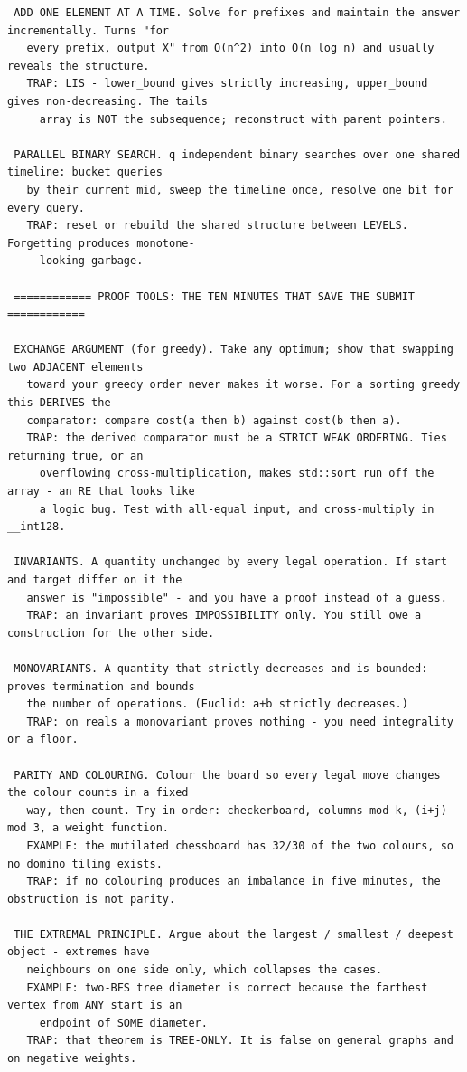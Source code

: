 \documentclass[9pt,a4paper,twocolumn]{extarticle}
\begin{document}
\begin{lstlisting}
 ADD ONE ELEMENT AT A TIME. Solve for prefixes and maintain the answer incrementally. Turns "for
   every prefix, output X" from O(n^2) into O(n log n) and usually reveals the structure.
   TRAP: LIS - lower_bound gives strictly increasing, upper_bound gives non-decreasing. The tails
     array is NOT the subsequence; reconstruct with parent pointers.

 PARALLEL BINARY SEARCH. q independent binary searches over one shared timeline: bucket queries
   by their current mid, sweep the timeline once, resolve one bit for every query.
   TRAP: reset or rebuild the shared structure between LEVELS. Forgetting produces monotone-
     looking garbage.

 ============ PROOF TOOLS: THE TEN MINUTES THAT SAVE THE SUBMIT ============

 EXCHANGE ARGUMENT (for greedy). Take any optimum; show that swapping two ADJACENT elements
   toward your greedy order never makes it worse. For a sorting greedy this DERIVES the
   comparator: compare cost(a then b) against cost(b then a).
   TRAP: the derived comparator must be a STRICT WEAK ORDERING. Ties returning true, or an
     overflowing cross-multiplication, makes std::sort run off the array - an RE that looks like
     a logic bug. Test with all-equal input, and cross-multiply in __int128.

 INVARIANTS. A quantity unchanged by every legal operation. If start and target differ on it the
   answer is "impossible" - and you have a proof instead of a guess.
   TRAP: an invariant proves IMPOSSIBILITY only. You still owe a construction for the other side.

 MONOVARIANTS. A quantity that strictly decreases and is bounded: proves termination and bounds
   the number of operations. (Euclid: a+b strictly decreases.)
   TRAP: on reals a monovariant proves nothing - you need integrality or a floor.

 PARITY AND COLOURING. Colour the board so every legal move changes the colour counts in a fixed
   way, then count. Try in order: checkerboard, columns mod k, (i+j) mod 3, a weight function.
   EXAMPLE: the mutilated chessboard has 32/30 of the two colours, so no domino tiling exists.
   TRAP: if no colouring produces an imbalance in five minutes, the obstruction is not parity.

 THE EXTREMAL PRINCIPLE. Argue about the largest / smallest / deepest object - extremes have
   neighbours on one side only, which collapses the cases.
   EXAMPLE: two-BFS tree diameter is correct because the farthest vertex from ANY start is an
     endpoint of SOME diameter.
   TRAP: that theorem is TREE-ONLY. It is false on general graphs and on negative weights.


\end{lstlisting}
\end{document}
